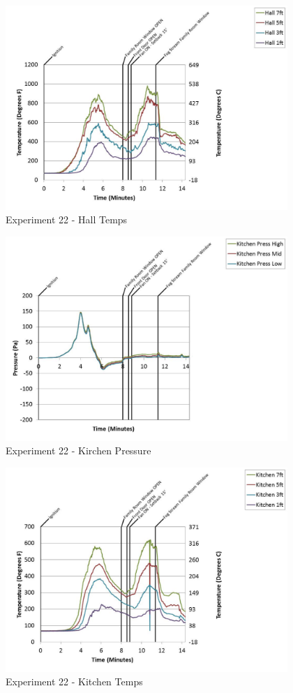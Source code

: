 \documentclass{article}
\begin{document}
\begin{appendices}
	\begin{figure}[h!]
		\centering
		\includegraphics[height=3.05in]{0_Images/Results_Charts/Exp_22_Charts/HallTemps.pdf}
		\caption{Experiment 22 - Hall Temps}
	\end{figure}
 
	\clearpage

	\begin{figure}[h!]
		\centering
		\includegraphics[height=3.05in]{0_Images/Results_Charts/Exp_22_Charts/KirchenPressure.pdf}
		\caption{Experiment 22 - Kirchen Pressure}
	\end{figure}
 

	\begin{figure}[h!]
		\centering
		\includegraphics[height=3.05in]{0_Images/Results_Charts/Exp_22_Charts/KitchenTemps.pdf}
		\caption{Experiment 22 - Kitchen Temps}
	\end{figure}
 

\end{appendices}
\end{document}
